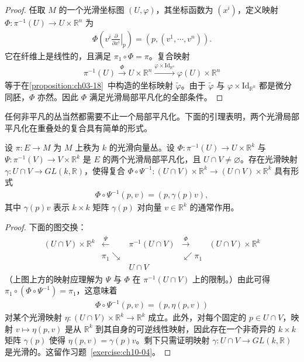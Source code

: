 \documentclass[../../main.tex]{subfiles}
\begin{document}
\begin{proof}
任取 $M$ 的一个光滑坐标图 $(U,\varphi)$，其坐标函数为 $(x^i)$，定义映射 $\Phi\colon\pi^{-1}(U)\to U\times\mathbb{R}^n$ 为
\begin{align}
\Phi\left(\left.v^i\frac{\partial}{\partial x^i}\right|_p\right)=(p,(v^1,\cdots ,v^n)).\label{align:ch10-平凡化坐标}
\end{align}
它在纤维上是线性的，且满足 $\pi_1\circ\Phi=\pi$。复合映射
\begin{align*}
\pi^{-1}(U)\xrightarrow{\Phi}U\times\mathbb{R}^n\xrightarrow{\varphi\times\mathrm{Id}_{\mathbb{R}^n}}\varphi(U)\times\mathbb{R}^n
\end{align*}
等于在\cref{proposition:ch03-18}~中构造的坐标映射 $\widetilde\varphi$。由于 $\widetilde\varphi$ 与 $\varphi\times\mathrm{Id}_{\mathbb{R}^n}$ 都是微分同胚，$\Phi$ 亦然。因此 $\Phi$ 满足光滑局部平凡化的全部条件。
\end{proof}

任何非平凡的丛当然都需要不止一个局部平凡化。下面的引理表明，两个光滑局部平凡化在重叠处的复合具有简单的形式。

\begin{lemma}\label{lemma:ch10-转移函数}
设 $\pi\colon E\to M$ 为 $M$ 上秩为 $k$ 的光滑向量丛。设 $\Phi\colon\pi^{-1}(U)\to U\times\mathbb{R}^k$ 与 $\Psi\colon\pi^{-1}(V)\to V\times\mathbb{R}^k$ 是 $E$ 的两个光滑局部平凡化，且 $U\cap V\neq\varnothing$。存在光滑映射 $\gamma\colon U\cap V\to GL(k,\mathbb{R})$，使得复合 $\Phi\circ\Psi^{-1}\colon(U\cap V)\times\mathbb{R}^k\to(U\cap V)\times\mathbb{R}^k$ 具有形式
\begin{align}
\Phi\circ\Psi^{-1}(p,v)=(p,\gamma(p)v),\label{align:ch10-转移函数形式}
\end{align}
其中 $\gamma(p)v$ 表示 $k\times k$ 矩阵 $\gamma(p)$ 对向量 $v\in\mathbb{R}^k$ 的通常作用。
\end{lemma}

\begin{proof}
下面的图交换：
\begin{align*}
\begin{array}{ccccc}
(U\cap V)\times\mathbb{R}^k & \xleftarrow{\Psi} & \pi^{-1}(U\cap V) & \xrightarrow{\Phi} & (U\cap V)\times\mathbb{R}^k\\
& \pi_1\searrow & & \swarrow\pi_1\\
&& U\cap V
\end{array}
\end{align*}
（上图上方的映射应理解为 $\Psi$ 与 $\Phi$ 在 $\pi^{-1}(U\cap V)$ 上的限制。）由此可得 $\pi_1\circ(\Phi\circ\Psi^{-1})=\pi_1$，这意味着
\begin{align*}
\Phi\circ\Psi^{-1}(p,v)=(p,\eta(p,v))
\end{align*}
对某个光滑映射 $\eta\colon(U\cap V)\times\mathbb{R}^k\to\mathbb{R}^k$ 成立。此外，对每个固定的 $p\in U\cap V$，映射 $v\mapsto\eta(p,v)$ 是从 $\mathbb{R}^k$ 到其自身的可逆线性映射，因此存在一个非奇异的 $k\times k$ 矩阵 $\gamma(p)$ 使得 $\eta(p,v)=\gamma(p)v$。剩下只需证明映射 $\gamma\colon U\cap V\to GL(k,\mathbb{R})$ 是光滑的。这留作习题~\ref{exercise:ch10-04}。
\end{proof}
\end{document}
